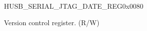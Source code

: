     \begin{register}{H}{USB\_SERIAL\_JTAG\_DATE\_REG}{0x0080}\label{regdesc:USBSERIALJTAGDATEREG}
        \regnewline%
        \begin{regdesc}\begin{reglist}
        \label{fielddesc:USBSERIALJTAGDATE}\item [USB\_SERIAL\_JTAG\_DATE] Version control register. (R/W)
        \end{reglist}\end{regdesc}
        \end{register}
